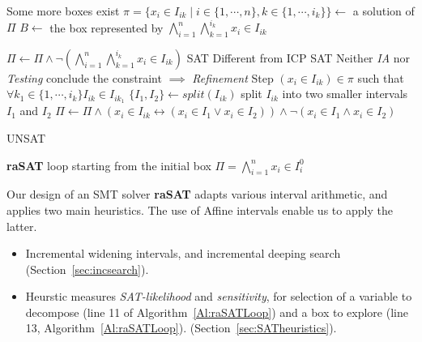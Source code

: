 \documentclass[runningheads,a4paper,oribibl]{llncs}
\begin{document}
\begin{algorithm}
\begin{algorithmic}[1]
 \Comment Some more boxes exist
\State $\pi = \{x_i \in I_{ik} \mid i \in \{1,\cdots, n\}, k \in \{1,\cdots, i_k\} \} \gets $
a solution of $\Pi$ 	
\State $B \gets $ the box represented by
$\bigwedge\limits_{i=1}^n\bigwedge\limits_{k=1}^{i_k}x_i \in I_{ik}$

\State $\Pi \gets \Pi \wedge \neg(\bigwedge\limits_{i=1}^n\bigwedge\limits_{k=1}^{i_k}x_i \in I_{ik})$
\State \Return SAT
   \Comment Different from ICP
\State \Return SAT
\Else \Comment Neither \emph{IA} nor \emph{Testing} conclude the constraint $\implies$
\emph{Refinement} Step
\State $(x_i \in I_{ik}) \in \pi$ such that $\forall k_1 \in \{1,\cdots, i_k\} I_{ik} \in I_{ik_1}$
\State $\{I_1, I_2\} \gets split(I_{ik})$ \Comment split $I_{ik}$
into two smaller intervals $I_1$ and $I_2$
\State $\Pi \gets \Pi \wedge (x_i \in I_{ik} \leftrightarrow (x_i \in I_1 \vee x_i \in I_2))
\wedge \neg(x_i \in I_1 \wedge x_i \in I_2)$

\EndIf
\EndWhile
\State \Return UNSAT
\end{algorithmic}
\caption{\textbf{raSAT} loop starting from the initial box
  $\Pi = \bigwedge\limits_{i=1}^n x_i \in I_i^0$}
\label{Al:raSATLoop}
\end{algorithm}

Our design of an SMT solver {\bf raSAT} adapts various interval arithmetic,
and applies two main heuristics. 
The use of Affine intervals enable us to apply the latter. 
\begin{itemize}
\item Incremental widening intervals, and incremental deeping search 
(Section~\ref{sec:incsearch}). 
\item 
Heurstic measures {\em SAT-likelihood} and {\em sensitivity}, 
for selection of a variable to decompose (line 11 of Algorithm~\ref{Al:raSATLoop}) and
a box to explore (line 13, Algorithm~\ref{Al:raSATLoop}). (Section~\ref{sec:SATheuristics}). 
\end{itemize} 

\end{document}
